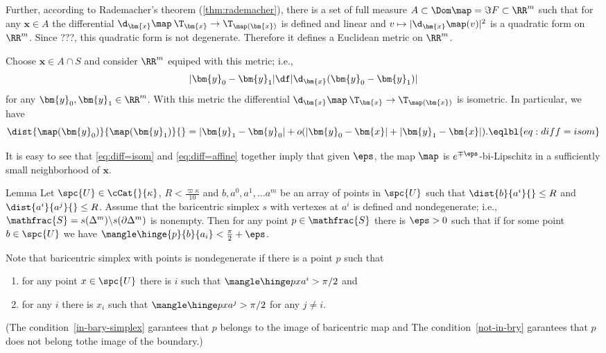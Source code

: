 Further, according to Rademacher's theorem (\ref{thm:rademacher}),
there is a set of full measure $A\subset \Dom\map=\Im F\subset \RR^m$ 
such that for any $\bm{x}\in A$
the  differential $\d_{\bm{x}}\map\:\T_{\bm{x}}\to\T_{\map(\bm{x})}$ is defined and linear
and $v\mapsto|\d_{\bm{x}}\map(v)|^2$ is a quadratic form on $\RR^m$.
Since ???, this quadratic form is not degenerate.
Therefore it defines a Euclidean metric on $\RR^m$.

Choose $\bm{x}\in A\cap S$ and consider $\RR^m$ equiped with this metric;
i.e.,
$$|\bm{y}_0-\bm{y}_1|
\df
|\d_{\bm{x}}(\bm{y}_0-\bm{y}_1)|$$
for any $\bm{y}_0,\bm{y}_1\in \RR^m$.
With this metric the differential $\d_{\bm{x}}\map\:\T_{\bm{x}}\to\T_{\map(\bm{x})}$ is isometric.
In particular, we have 
$$
\dist{\map(\bm{y}_0)}{\map(\bm{y}_1)}{}
=
|\bm{y}_1-\bm{y}_0|+o(|\bm{y}_0-\bm{x}|+|\bm{y}_1-\bm{x}|).
\eqlbl{eq:diff=isom}
$$

It is easy to see that \ref{eq:diff=isom} and \ref{eq:diff=affine} together 
imply that given $\eps$, 
the map $\map$ is $e^{\mp\eps}$-bi-Lipschitz
in a sufficiently small neighborhood of $\bm{x}$.






\begin{thm}{Lemma}
Let $\spc{U}\in\cCat{}{\kappa}$,
$R<\tfrac{\varpi\kappa}{10}$
and $b,a^0,a^1,\dots a^m$ be an array of points in $\spc{U}$ such that
$\dist{b}{a^i}{}\le R$ and $\dist{a^i}{a^j}{}\le R$.
Assume that the baricentric simplex $s$ with vertexes at $a^i$ is defined 
and nondegenerate; 
i.e.,  $\mathfrac{S}=s(\Delta^m)\backslash s(\partial\Delta^m)$ is nonempty.
Then for any point $p\in \mathfrac{S}$ there is $\eps>0$ such that if for some point $b\in\spc{U}$
we have $\mangle\hinge{p}{b}{a_i}<\tfrac\pi2+\eps$.
\end{thm}

Note that baricentric simplex with points is nondegenerate if there is a point $p$ such that
\begin{enumerate}
\item\label{in-bary-simplex} for any point $x\in \spc{U}$ there is $i$ such that $\mangle\hinge px{a^i}>\pi/2$ and
\item\label{not-in-bry} for any $i$ there is $x_i$ such that $\mangle\hinge px{a^j}>\pi/2$ for any $j\not=i$.
\end{enumerate}
(The condition~\ref{in-bary-simplex} garantees that $p$ belongs to the image of baricentric map and
The condition~\ref{not-in-bry} garantees that $p$ does not belong tothe image of the boundary.)

